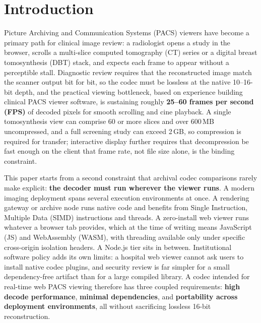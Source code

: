 \documentclass[journal]{IEEEtran}
\begin{document}
\section{Introduction}
\label{sec:intro}

 Picture Archiving and Communication Systems (PACS)
viewers have become a primary path for clinical image review: a radiologist
opens a study in the browser, scrolls a multi-slice computed tomography (CT)
series or a digital breast tomosynthesis (DBT) stack, and expects each frame to
appear without a perceptible stall. Diagnostic review requires that the
reconstructed image match the scanner output bit for bit, so the codec must be
lossless at the native 10--16-bit depth, and the practical viewing bottleneck,
based on experience building clinical PACS viewer software, is sustaining
roughly \textbf{25--60 frames per second (FPS)} of decoded pixels for smooth
scrolling and cine playback. A single tomosynthesis view can comprise 60 or
more slices and over 600\,MB uncompressed, and a full screening study can
exceed 2\,GB, so compression is required for transfer; interactive display
further requires that decompression be fast enough on the client that frame
rate, not file size alone, is the binding constraint.

This paper starts from a second constraint that archival codec comparisons
rarely make explicit: \textbf{the decoder must run wherever the viewer runs}.
A modern imaging deployment spans several execution environments at once.
A rendering gateway or archive node runs native code and benefits from
Single Instruction, Multiple Data (SIMD) instructions and threads. A
zero-install web viewer runs whatever a browser tab provides, which at the
time of writing means JavaScript (JS) and WebAssembly (WASM), with threading
available only under specific cross-origin isolation headers. A Node.js
tier sits in between. Institutional software policy adds its own limits: a
hospital web viewer cannot ask users to install native codec plugins, and
security review is far simpler for a small dependency-free artifact than for
a large compiled library. A codec intended for real-time web PACS viewing
therefore has three coupled requirements: \textbf{high decode performance},
\textbf{minimal dependencies}, and \textbf{portability across deployment
environments}, all without sacrificing lossless 16-bit reconstruction.
\end{document}
